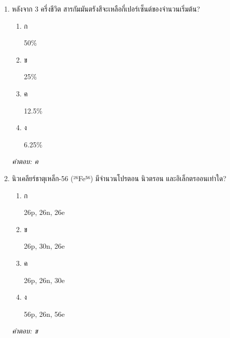 \documentclass[12pt]{article}
\begin{document}
\begin{enumerate}[label=\arabic*., itemsep=0.5\baselineskip, topsep=0.5\baselineskip, leftmargin=*]
\item หลังจาก 3 ครึ่งชีวิต สารกัมมันตรังสีจะเหลือกี่เปอร์เซ็นต์ของจำนวนเริ่มต้น?
\begin{enumerate}[label=\alph*)., itemsep=0.3\baselineskip, topsep=0.3\baselineskip]
\item ก\ 
\begin{minipage}[t]{0.9\linewidth}
\raggedright 50\%
\end{minipage}
\item ข\ 
\begin{minipage}[t]{0.9\linewidth}
\raggedright 25\%
\end{minipage}
\item ค\ 
\begin{minipage}[t]{0.9\linewidth}
\raggedright 12.5\%
\end{minipage}
\item ง\ 
\begin{minipage}[t]{0.9\linewidth}
\raggedright 6.25\%
\end{minipage}
\end{enumerate}
\vspace{-0.3\baselineskip}
\begin{small}
\textit{คำตอบ: ค}
\end{small}

\item นิวเคลียร์ธาตุเหล็ก-56 (²⁶Fe⁵⁶) มีจำนวนโปรตอน นิวตรอน และอิเล็กตรออนเท่าใด?
\begin{enumerate}[label=\alph*)., itemsep=0.3\baselineskip, topsep=0.3\baselineskip]
\item ก\ 
\begin{minipage}[t]{0.9\linewidth}
\raggedright 26p, 26n, 26e
\end{minipage}
\item ข\ 
\begin{minipage}[t]{0.9\linewidth}
\raggedright 26p, 30n, 26e
\end{minipage}
\item ค\ 
\begin{minipage}[t]{0.9\linewidth}
\raggedright 26p, 26n, 30e
\end{minipage}
\item ง\ 
\begin{minipage}[t]{0.9\linewidth}
\raggedright 56p, 26n, 56e
\end{minipage}
\end{enumerate}
\vspace{-0.3\baselineskip}
\begin{small}
\textit{คำตอบ: ข}
\end{small}


\end{enumerate}
\end{document}
